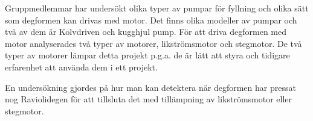 Gruppmedlemmar har undersökt olika typer av pumpar för fyllning och olika sätt som degformen kan drivas med motor. Det finns olika modeller av pumpar och två av dem är Kolvdriven och kugghjul pump. För att driva degformen med motor analyserades två typer av motorer, likströmsmotor och stegmotor. De två typer av motorer lämpar detta projekt p.g.a. de är lätt att styra och tidigare erfarenhet att använda dem i ett projekt.

En undersökning gjordes på hur man kan detektera när degformen har pressat nog Raviolidegen för att tillsluta det med tillämpning av likströmsmotor eller stegmotor.
